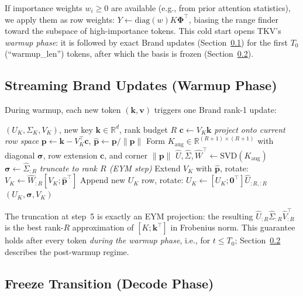 \documentclass{article}
\newcommand{\R}{\mathbb{R}}
\let\PhiSymbol\Phi
\renewcommand{\Phi}{\boldsymbol{\PhiSymbol}}
\begin{document}
If importance weights $w_i \geq 0$ are available (e.g., from prior attention
statistics), we apply them as row weights: $Y \leftarrow \mathrm{diag}(w)K\Phi^\top$,
biasing the range finder toward the subspace of high-importance tokens.
This cold start opens TKV's \emph{warmup phase}: it is followed by exact
Brand updates (Section~\ref{sec:brand}) for the first $T_0$ (``warmup\_len'')
tokens, after which the basis is frozen (Section~\ref{sec:freeze}).

\subsection{Streaming Brand Updates (Warmup Phase)}
\label{sec:brand}

During warmup, each new token $(\mathbf{k}, \mathbf{v})$ triggers one Brand
rank-1 update:

\begin{algorithm}[H]
\caption{Brand Rank-1 Update (per token)}
\begin{algorithmic}[1]
\Require $(U_K, \Sigma_K, V_K)$, new key $\mathbf{k} \in \R^d$, rank budget $R$
\State $\mathbf{c} \leftarrow V_K \mathbf{k}$  \hfill \textit{project onto current row space}
\State $\mathbf{p} \leftarrow \mathbf{k} - V_K^\top \mathbf{c}$,
       $\hat{\mathbf{p}} \leftarrow \mathbf{p}/\|\mathbf{p}\|$
\State Form $K_{\mathrm{aug}} \in \R^{(R+1)\times(R+1)}$ with diagonal $\boldsymbol{\sigma}$, row extension $\mathbf{c}$, and corner $\|\mathbf{p}\|$
\State $\hat{U}, \hat{\Sigma}, \hat{W}^\top \leftarrow \mathrm{SVD}(K_{\mathrm{aug}})$
\State $\boldsymbol{\sigma} \leftarrow \hat{\Sigma}_{:R}$  \hfill \textit{truncate to rank $R$ (EYM step)}
\State Extend $V_K$ with $\hat{\mathbf{p}}$, rotate: $V_K \leftarrow \hat{W}_{:R} [V_K; \hat{\mathbf{p}}^\top]$
\State Append new $U_K$ row, rotate: $U_K \leftarrow [U_K; \mathbf{0}^\top] \hat{U}_{:R,:R}$
\State \Return $(U_K, \boldsymbol{\sigma}, V_K)$
\end{algorithmic}
\end{algorithm}

The truncation at step~5 is exactly an EYM projection: the resulting
$\hat{U}_{:R} \hat{\Sigma}_{:R} \hat{V}_{:R}^\top$ is the best rank-$R$
approximation of $[K; \mathbf{k}^\top]$ in Frobenius norm.  This guarantee
holds after every token \emph{during the warmup phase}, i.e., for
$t \leq T_0$; Section~\ref{sec:freeze} describes the post-warmup regime.

\subsection{Freeze Transition (Decode Phase)}
\label{sec:freeze}
\end{document}
